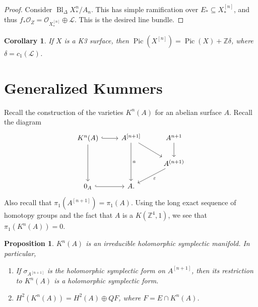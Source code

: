 \documentclass[leqno, openany]{memoir}
\newtheorem{cor}[thm]{Corollary}
\newtheorem{prop}[thm]{Proposition}
\theoremstyle{definition}
\theoremstyle{remark}
\theoremstyle{plain}
\theoremstyle{definition}
\theoremstyle{remark}
\newcommand{\Z}{\mathbb{Z}}
\newcommand{\ep}{\varepsilon}
\newcommand{\mc}[1]{\mathcal{#1}}
\DeclareMathOperator{\Pic}{Pic}
\DeclareMathOperator{\Bl}{Bl}
\begin{document}
\begin{proof}
    Consider $\Bl_{\Delta} X_*^n / A_{n}$. This has simple ramification over $E_* \subseteq X_*^{[n]}$, and thus $f_* \mc{O}_Z = \mc{O}_{X_*^{[n]}} \oplus \mc{L}$. This is the desired line bundle.
\end{proof}

\begin{cor}
    If $X$ is a K3 surface, then $\Pic(X^{[n]}) = \Pic(X) + \Z \delta$, where $\delta = c_1(\mc{L})$.
\end{cor}

\section{Generalized Kummers}%
\label{sec:generalized_kummers}

Recall the construction of the varieties $K^n(A)$ for an abelian surface $A$. Recall the diagram
\begin{equation*}
\begin{tikzcd}
    K^n(A) \ar[hookrightarrow]{r} \ar{dd} & A^{[n+1]} \ar{dd}{a} \ar{dr} & A^{n+1} \ar{d} \\
    & & A^{(n+1)} \ar{dl}{\ep} \\
    0_A \ar[hookrightarrow]{r} & A.
\end{tikzcd}
\end{equation*}
Also recall that $\pi_1(A^{[n+1]}) = \pi_1(A)$. Using the long exact sequence of homotopy groups and the fact that $A$ is a $K(\Z^4,1)$, we see that $\pi_1(K^n(A)) = 0$.

\begin{prop}
    $K^n(A)$ is an irreducible holomorphic symplectic manifold. In particular,
    \begin{enumerate}
        \item If $\sigma_{A^{[n+1]}}$ is the holomorphic symplectic form on $A^[n+1]$, then its restriction to $K^n(A)$ is a holomorphic symplectic form.
        \item $H^2(K^n(A)) = H^2(A) \oplus Q F$, where $F = E \cap K^n(A)$.
    \end{enumerate}
\end{prop}
\end{document}
